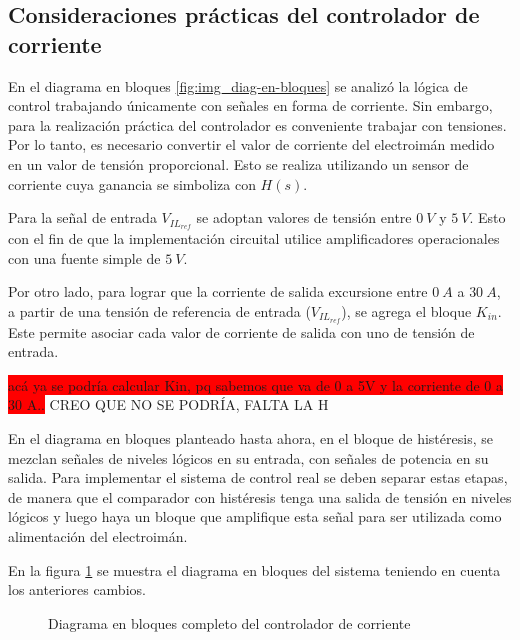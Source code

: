 \subsection{Consideraciones prácticas del controlador de corriente}

En el diagrama en bloques \ref{fig:img_diag-en-bloques} se analizó la lógica de control trabajando únicamente con señales en forma de corriente. Sin embargo, para la realización práctica del controlador es conveniente trabajar con tensiones. Por lo tanto, es necesario  convertir el valor de corriente del electroimán medido en un valor de tensión proporcional. Esto se realiza utilizando un sensor de corriente cuya ganancia se simboliza con $H(s)$.

Para la señal de entrada $V_{IL_{ref}}$ se adoptan valores de tensión entre $0\:V$ y $5\:V$. Esto con el fin de que la implementación circuital utilice amplificadores operacionales con una fuente simple de $5\:V$. 

Por otro lado, para lograr que la corriente de salida excursione entre $0\:A$ a $30\:A$, a partir de una tensión de referencia de entrada ($V_{IL_{ref}}$), se agrega el bloque $K_{in}$. Este permite asociar cada valor de corriente de salida con uno de tensión de entrada.

\colorbox{red}{acá ya se podría calcular Kin, pq sabemos que va de 0 a 5V y la corriente de 0 a 30 A..} CREO QUE NO SE PODRÍA, FALTA LA H

En el diagrama en bloques planteado hasta ahora, en el bloque de histéresis, se mezclan señales de niveles lógicos en su entrada, con señales de potencia en su salida. Para implementar el sistema de control real se deben separar estas etapas, de manera que el comparador con histéresis tenga una salida de tensión en niveles lógicos y luego haya un bloque que amplifique esta señal para ser utilizada como alimentación del electroimán.

En la figura \ref{fig:img_diag-en-bloques-conH-y-Kin} se muestra el diagrama en bloques del sistema teniendo en cuenta los anteriores cambios.


\begin{figure}[H]
	\centering
	
	\caption{Diagrama en bloques completo del controlador de corriente}	\label{fig:img_diag-en-bloques-conH-y-Kin}
\end{figure}

